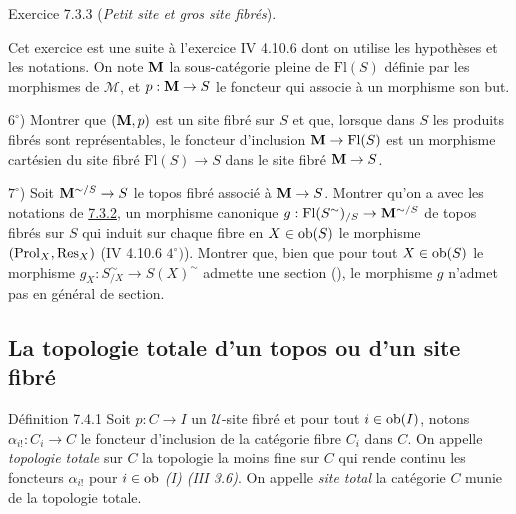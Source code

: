 \documentclass[10pt]{../fichiers-configuration-latex/smfart}
\begin{document}
\begin{enonce*}[remark]{Exercice 7.3.3}
(\emph{Petit site et gros site fibrés}).

Cet exercice est une suite à l'exercice IV 4.10.6 dont on utilise les
hypothèses et les notations. On note $\mathbf{M}$ la sous-catégorie
pleine de $\text{Fl}(S)$ définie par les morphismes de $ℳ$,
et $p : \MM \to S$ le foncteur qui associe à un morphisme son but.

$6^{\circ}$) Montrer que $(\mathbf{M}, p)$ est un site fibré sur $S$ et
que, lorsque dans $S$ les produits fibrés sont représentables, le
foncteur d'inclusion $\MM \to \text{Fl}(S)$ est un morphisme cartésien du
site fibré $\text{Fl} (S) \to S$ dans le site fibré $\MM \to S$.

$7^{\circ}$) Soit $\MM^{\sim/S} \to S$ le topos fibré associé à
$\MM \to S$. Montrer qu'on a avec les notations de \hyperref[VI.exem7.3.2]{7.3.2}, un
morphisme canonique $g : \text{Fl} (S^{\sim})_{/S} \to \MM^{\sim/S}$ de
topos fibrés sur $S$ qui induit sur chaque fibre en $X \in \operatorname{ob} (S)$ le
morphisme $(\operatorname{Prol}_{X}, \operatorname{Res}_X)$ (IV 4.10.6 $4^{\circ})$). Montrer que,
bien que pour tout $X \in \operatorname{ob} (S)$ le morphisme $g_X : S^{\sim}_{/X}
\to S(X)^{\sim}$ admette une section (\loccit), le morphisme $g$
n'admet pas en général de section.
\end{enonce*}

\subsection{La topologie totale d'un topos ou d'un site fibré}

\begin{enonce*}{Définition 7.4.1}
Soit $p  : C \to I$ un $𝒰$-site fibré et pour tout $i \in \operatorname{ob} (I)$,
notons $\alpha_{i!} : C_i \to C$ le foncteur d'inclusion de la
catégorie fibre $C_i$ dans $C$. On appelle \emph{topologie totale} sur $C$ la
topologie la moins fine sur $C$ qui rende continu les foncteurs
$\alpha_{i!}$ pour $i \in \operatorname{ob}$ \emph{(I) (III 3.6)}. On appelle
\emph{site total}  la
catégorie $C$ munie de la topologie totale.
\end{enonce*}
\end{document}
